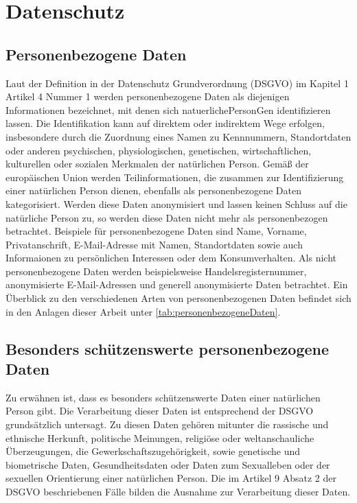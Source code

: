 \section{Datenschutz}
\subsection{Personenbezogene Daten}
Laut der Definition in der Datenschutz Grundverordnung (\gls{DSGVO}) im Kapitel 1 Artikel 4 Nummer 1 werden personenbezogene Daten als diejenigen Informationen bezeichnet, mit denen sich \gls{natuerlichePersonG}en identifizieren lassen. Die Identifikation kann auf direktem oder indirektem Wege erfolgen, insbesondere durch die Zuordnung eines Namen zu Kennnummern, Standortdaten oder anderen psychischen, physiologischen, genetischen, wirtschaftlichen, kulturellen oder sozialen Merkmalen der natürlichen Person. \cite{DSGVO_Art4} Gemäß der europäischen Union werden Teilinformationen, die zusammen zur Identifizierung einer natürlichen Person dienen, ebenfalls als personenbezogene Daten kategorisiert. Werden diese Daten anonymisiert und lassen keinen Schluss auf die natürliche Person zu, so werden diese Daten nicht mehr als personenbezogen betrachtet. Beispiele für personenbezogene Daten sind Name, Vorname, Privatanschrift, E-Mail-Adresse mit Namen, Standortdaten sowie auch Informaionen zu persönlichen Interessen oder dem Konsumverhalten. Als nicht personenbezogene Daten werden beispielsweise Handelsregisternummer, anonymisierte E-Mail-Adressen und generell anonymisierte Daten betrachtet. \cite{PersBezDaten_2021} Ein Überblick zu den verschiedenen Arten von personenbezogenen Daten befindet sich in den Anlagen dieser Arbeit unter \ref{tab:personenbezogeneDaten}.

\subsection{Besonders schützenswerte personenbezogene Daten} \label{DSGVO_besonders}
Zu erwähnen ist, dass es besonders schützenswerte Daten einer natürlichen Person gibt. Die Verarbeitung dieser Daten ist entsprechend der DSGVO grundsätzlich untersagt. Zu diesen Daten gehören mitunter die rassische und ethnische Herkunft, politische Meinungen, religiöse oder weltanschauliche Überzeugungen, die Gewerkschaftszugehörigkeit, sowie genetische und biometrische Daten, Gesundheitsdaten oder Daten zum Sexualleben oder der sexuellen Orientierung einer natürlichen Person. Die im Artikel 9 Absatz 2 der DSGVO beschriebenen Fälle bilden die Ausnahme zur Verarbeitung dieser Daten. \cite{DSGVO_Art9}